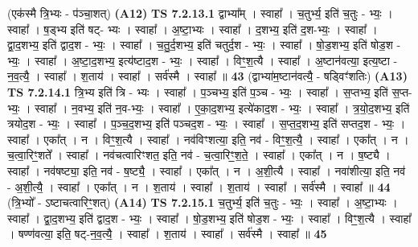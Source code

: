 \documentclass[17pt]{extarticle}
\begin{document}
                  \newline
                      (एक॑स्मै त्रि॒भ्यः - प॑ञ्चा॒शत्)  \textbf{(A12)} \newline \newline
                                \textbf{ TS 7.2.13.1} \newline
                  द्वाभ्या᳚म् । स्वाहा᳚ । च॒तुर्भ्य॒ इति॑ च॒तुः - भ्यः॒ । स्वाहा᳚ । ष॒ड्भ्य इति॑ षट्- भ्यः । स्वाहा᳚ । अ॒ष्टा॒भ्यः । स्वाहा᳚ । द॒शभ्य॒ इति॑ द॒श-भ्यः॒ । स्वाहा᳚ । द्वा॒द॒शभ्य॒ इति॑ द्वाद॒श - भ्यः॒ । स्वाहा᳚ । च॒तु॒र्द॒शभ्य॒ इति॑ चतुर्द॒श - भ्यः॒ । स्वाहा᳚ । षो॒ड॒शभ्य॒ इति॑ षोड॒श - भ्यः॒ । स्वाहा᳚ । अ॒ष्टा॒द॒शभ्य॒ इत्य॑ष्टाद॒श - भ्यः॒ । स्वाहा᳚ । विꣳ॒॒श॒त्यै । स्वाहा᳚ । अ॒ष्टान॑वत्या॒ इत्य॒ष्टा - न॒व॒त्यै॒ । स्वाहा᳚ । श॒ताय॑ । स्वाहा᳚ । सर्व॑स्मै । स्वाहा᳚ ॥ \textbf{  43} \newline
                  \newline
                      (द्वाभ्या॑म॒ष्टान॑वत्यै॒ - षड्विꣳ॑शतिः)  \textbf{(A13)} \newline \newline
                                \textbf{ TS 7.2.14.1} \newline
                  त्रि॒भ्य इति॑ त्रि - भ्यः । स्वाहा᳚ । प॒ञ्चभ्य॒ इति॑ प॒ञ्च - भ्यः॒ । स्वाहा᳚ । स॒प्तभ्य॒ इति॑ स॒प्त-भ्यः॒ । स्वाहा᳚ । न॒वभ्य॒ इति॑ न॒व-भ्यः॒ । स्वाहा᳚ । ए॒का॒द॒शभ्य॒ इत्ये॑काद॒श - भ्यः॒ । स्वाहा᳚ । त्र॒यो॒द॒शभ्य॒ इति॑ त्रयोद॒श - भ्यः॒ । स्वाहा᳚ । प॒ञ्च॒द॒शभ्य॒ इति॑ पञ्चद॒श - भ्यः॒ । स्वाहा᳚ । स॒प्त॒द॒शभ्य॒ इति॑ सप्तद॒श - भ्यः॒ । स्वाहा᳚ । एका᳚त् । न । विꣳ॒॒श॒त्यै । स्वाहा᳚ । नव॑विꣳशत्या॒ इति॒ नव॑ - विꣳ॒॒श॒त्यै॒ । स्वाहा᳚ । एका᳚त् । न । च॒त्वा॒रिꣳ॒॒शते᳚ । स्वाहा᳚ । नव॑चत्वारिꣳशत॒ इति॒ नव॑ - च॒त्वा॒रिꣳ॒॒श॒ते॒ । स्वाहा᳚ । एका᳚त् । न । ष॒ष्ट्यै । स्वाहा᳚ । नव॑षष्ट्या॒ इति॒ नव॑ - ष॒ष्ट्यै॒ । स्वाहा᳚ । एका᳚त् । न । अ॒शी॒त्यै । स्वाहा᳚ । नवा॑शीत्या॒ इति॒ नव॑ - अ॒शी॒त्यै॒ । स्वाहा᳚ । एका᳚त् । न । श॒ताय॑ । स्वाहा᳚ । श॒ताय॑ । स्वाहा᳚ । सर्व॑स्मै । स्वाहा᳚ ॥ \textbf{  44} \newline
                  \newline
                      (त्रि॒भ्यो᳚ - ऽष्टाचत्वारिꣳ॒॒शत्)  \textbf{(A14)} \newline \newline
                                \textbf{ TS 7.2.15.1} \newline
                  च॒तुर्भ्य॒ इति॑ च॒तुः - भ्यः॒ । स्वाहा᳚ । अ॒ष्टा॒भ्यः । स्वाहा᳚ । द्वा॒द॒शभ्य॒ इति॑ द्वाद॒श - भ्यः॒ । स्वाहा᳚ । षो॒ड॒शभ्य॒ इति॑ षोड॒श - भ्यः॒ । स्वाहा᳚ । विꣳ॒॒श॒त्यै । स्वाहा᳚ । षण्ण॑वत्या॒ इति॒ षट्-न॒व॒त्यै॒ । स्वाहा᳚ । श॒ताय॑ । स्वाहा᳚ । सर्व॑स्मै । स्वाहा᳚ ॥ \textbf{  45} \newline
\end{document}
